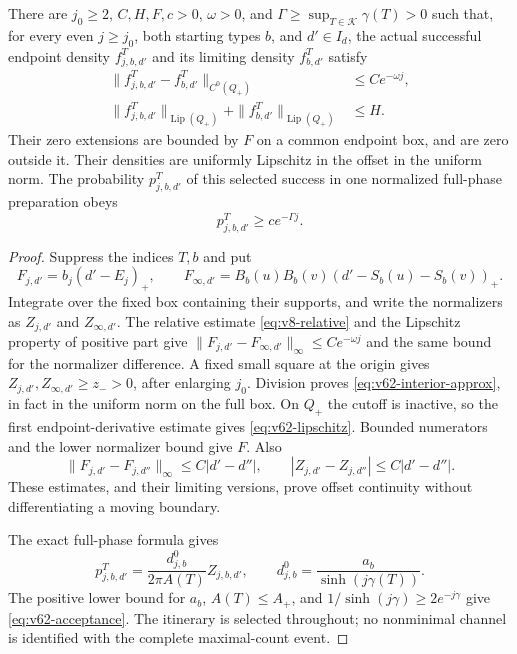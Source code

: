 \begin{lemma}
\label{lem:v62-finite-densities}
There are $j_0\ge2$, $C,H,F,c>0$, $\omega>0$, and
$\Gamma\ge\sup_{T\in\mathcal K}\gamma(T)>0$ such that, for every even
$j\ge j_0$, both starting types $b$, and $d'\in I_d$, the actual
successful endpoint density $f_{j,b,d'}^T$ and its limiting density
$f_{b,d'}^T$ satisfy
\begin{align}
 \|f_{j,b,d'}^T-f_{b,d'}^T\|_{C^0(Q_+)}
       &\le C e^{-\omega j},
       \label{eq:v62-interior-approx}\\
 \|f_{j,b,d'}^T\|_{\operatorname{Lip}(Q_+)}
       +\|f_{b,d'}^T\|_{\operatorname{Lip}(Q_+)}&\le H.
       \label{eq:v62-lipschitz}
\end{align}
Their zero extensions are bounded by $F$ on a common endpoint box, and
are zero outside it.  Their densities are uniformly Lipschitz in the
offset in the uniform norm.  The probability $p_{j,b,d'}^T$ of this
selected success in one normalized full-phase preparation obeys
\begin{equation}\label{eq:v62-acceptance}
                 p_{j,b,d'}^T\ge c e^{-\Gamma j}.
\end{equation}
\end{lemma}

\begin{proof}
Suppress the indices $T,b$ and put
\[
 F_{j,d'}=b_j(d'-E_j)_+,
 \qquad F_{\infty,d'}=B_b(u)B_b(v)(d'-S_b(u)-S_b(v))_+.
\]
Integrate over the fixed box containing their supports, and write the
normalizers as $Z_{j,d'}$ and $Z_{\infty,d'}$.  The relative estimate
\eqref{eq:v8-relative} and the Lipschitz property of positive part give
$\|F_{j,d'}-F_{\infty,d'}\|_\infty\le C e^{-\omega j}$ and the same
bound for the normalizer difference.  A fixed small square at the
origin gives $Z_{j,d'},Z_{\infty,d'}\ge z_->0$, after enlarging $j_0$.
Division proves \eqref{eq:v62-interior-approx}, in fact in the uniform
norm on the full box.  On $Q_+$ the cutoff is inactive, so the first
endpoint-derivative estimate gives \eqref{eq:v62-lipschitz}.  Bounded
numerators and the lower normalizer bound give $F$.  Also
\[
 \|F_{j,d'}-F_{j,d''}\|_\infty\le C|d'-d''|,
 \qquad |Z_{j,d'}-Z_{j,d''}|\le C|d'-d''|.
\]
These estimates, and their limiting versions, prove offset continuity
without differentiating a moving boundary.

The exact full-phase formula gives
\[
 p_{j,b,d'}^T=\frac{d_{j,b}^0}{2\pi A(T)}Z_{j,b,d'},
 \qquad d_{j,b}^0=\frac{a_b}{\sinh(j\gamma(T))}.
\]
The positive lower bound for $a_b$, $A(T)\le A_+$, and
$1/\sinh(j\gamma)\ge2e^{-j\gamma}$ give
\eqref{eq:v62-acceptance}.  The itinerary is selected throughout; no
nonminimal channel is identified with the complete maximal-count event.
\end{proof}

